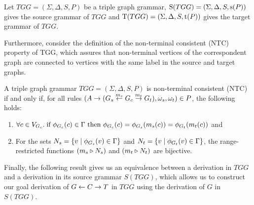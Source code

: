 \begin{definition}
	\label{def:Source}
	Let $TGG = (\Sigma, \Delta, S, P)$ be a triple graph grammar, $\Source(TGG) = (\Sigma, \Delta, S, \source(P))$ gives the source grammar of $TGG$ and $\Target(TGG) = (\Sigma, \Delta, S, \target(P))$ gives the target grammar of $TGG$.
\end{definition}

Furthermore, consider the definition of the non-terminal consistent (NTC) property of TGG, which assures that non-terminal vertices of the correspondent graph are connected to vertices with the same label in the source and target graphs.

\begin{definition}
	A triple graph grammar $TGG = (\Sigma, \Delta, S, P)$ is non-terminal consistent (NTC) if and only if, for all rules $(A \pro (G_s \ms{m_s} G_c \mt{m_t} G_t), \omega_s, \omega_t) \in P$, the following holds:
	\begin{enumerate}
		\item $\forall c \in V_{G_c} \. \text{if } \phi_{G_c}(c) \in \Gamma \text{ then } \phi_{G_c}(c) = \phi_{G_s}(m_s(c)) = \phi_{G_t}(m_t(c))$ and
		\item For the sets $N_s = \{v \st \phi_{G_s}(v) \in \Gamma\}$ and $N_t = \{v \st \phi_{G_t}(v) \in \Gamma\}$, the range-restricted functions $(m_s \rrestr N_s)$ and $(m_t \rrestr N_t)$ are bijective.
	\end{enumerate}
\end{definition}

Finally, the following result gives us an equivalence between a derivation in $TGG$ and a derivation in its source grammar $S(TGG)$, which allows us to construct our goal derivation of $G \ms{} C \mt{} T$ in $TGG$ using the derivation of $G$ in $S(TGG)$.

